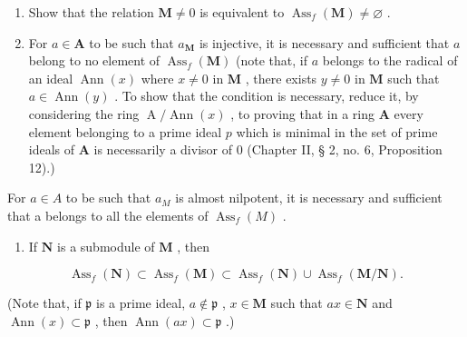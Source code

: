 \begin{enumerate}
\def\labelenumi{(\alph{enumi})}
\item
  Show that the relation \(\mathbf{M} \neq 0\) is equivalent to \(\operatorname{Ass}_f(\mathbf{M}) \neq \varnothing\) .
\item
  For \(a \in \mathbf{A}\) to be such that \(a_{\mathbf{M}}\) is injective, it is necessary and sufficient that \(a\) belong to no element of \(\operatorname{Ass}_f(\mathbf{M})\) (note that, if \(a\) belongs to the radical of an ideal \(\operatorname{Ann}(x)\) where \(x \neq 0\) in \(\mathbf{M}\) , there exists \(y \neq 0\) in \(\mathbf{M}\) such that \(a \in \operatorname{Ann}(y)\) . To show that the condition is necessary, reduce it, by considering the ring \(\operatorname{A}/\operatorname{Ann}(x)\) , to proving that in a ring \(\mathbf{A}\) every element belonging to a prime ideal \(p\) which is minimal in the set of prime ideals of \(\mathbf{A}\) is necessarily a divisor of 0 (Chapter II, § 2, no. 6, Proposition 12).)
\end{enumerate}

For \(a \in A\) to be such that \(a_{M}\) is almost nilpotent, it is necessary and sufficient that a belongs to all the elements of \(\operatorname{Ass}_{f}(M)\) .

\begin{enumerate}
\def\labelenumi{(\alph{enumi})}
\setcounter{enumi}{2}
\tightlist
\item
  If \(\mathbf{N}\) is a submodule of \(\mathbf{M}\) , then
\end{enumerate}

\[
\operatorname{Ass} _ {f} (\mathbf {N}) \subset \operatorname{Ass} _ {f} (\mathbf {M}) \subset \operatorname{Ass} _ {f} (\mathbf {N}) \cup \operatorname{Ass} _ {f} (\mathbf {M} / \mathbf {N}).
\]

(Note that, if \(\mathfrak{p}\) is a prime ideal, \(a \notin \mathfrak{p}\) , \(x \in \mathbf{M}\) such that \(ax \in \mathbf{N}\) and \(\operatorname{Ann}(x) \subset \mathfrak{p}\) , then \(\operatorname{Ann}(ax) \subset \mathfrak{p}\) .)


